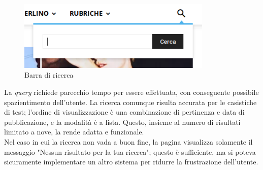 \begin{figure}[htbp]
\begin{center}
\includegraphics[width=25em]{img/barraricerca}
\caption{Barra di ricerca}
\end{center}
\end{figure}
\vspace{30pt}

La \textit{query} richiede parecchio tempo per essere effettuata, con conseguente possibile spazientimento dell'utente. La ricerca comunque risulta accurata per le casistiche di test; l'ordine di visualizzazione è una combinazione di pertinenza e data di pubblicazione, e la modalità è a lista. Questo, insieme al numero di risultati limitato a nove, la rende adatta e funzionale.\\
Nel caso in cui la ricerca non vada a buon fine, la pagina visualizza solamente il messaggio "Nessun risultato per la tua ricerca"; questo è sufficiente, ma si poteva sicuramente implementare un altro sistema per ridurre la frustrazione dell'utente.